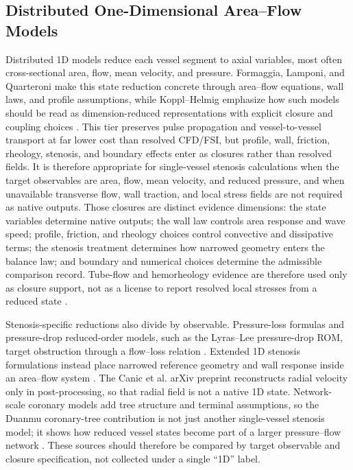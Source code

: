 \subsection{Distributed One-Dimensional Area--Flow Models}
\label{subsec:distributed-one-dimensional-models}

Distributed 1D models reduce each vessel segment to axial variables, most often
cross-sectional area, flow, mean velocity, and pressure. Formaggia, Lamponi,
and Quarteroni make this state reduction concrete through area--flow equations,
wall laws, and profile assumptions, while Koppl--Helmig emphasize how such
models should be read as dimension-reduced representations with explicit
closure and coupling choices
\cite{FormaggiaEtAl2003OneDimensionalBloodFlow,KopplHelmig2023DimensionReducedModeling}.
This tier preserves pulse propagation and vessel-to-vessel transport at far
lower cost than resolved CFD/FSI, but profile, wall, friction, rheology,
stenosis, and boundary effects enter as closures rather than resolved fields.
It is therefore appropriate for single-vessel stenosis calculations when the
target observables are area, flow, mean velocity, and reduced pressure, and
when unavailable transverse flow, wall traction, and local stress fields are
not required as native outputs.
Those closures are distinct evidence dimensions: the state variables determine
native outputs; the wall law controls area response and wave speed; profile,
friction, and rheology choices control convective and dissipative terms; the
stenosis treatment determines how narrowed geometry enters the balance law; and
boundary and numerical choices determine the admissible comparison record.
Tube-flow and hemorheology evidence are therefore used only as closure support,
not as a license to report resolved local stresses from a reduced state
\cite{PriesEtAl1992BloodViscosityTubeFlow,GaldiEtAl2008HemodynamicalFlows,KumarEtAl2019CarreauYasudaHemodynamics,LiuEtAl2021ICASRheology}.

Stenosis-specific reductions also divide by observable. Pressure-loss formulas
and pressure-drop reduced-order models, such as the Lyras--Lee pressure-drop
ROM, target obstruction through a flow--loss relation
\cite{LyrasLee2021PressureDropROM}. Extended 1D stenosis formulations instead
place narrowed reference geometry and wall response inside an area--flow system
\cite{CanicEtAl2024Extended1DStenosis}. The Canic et al. arXiv preprint
reconstructs radial velocity only in post-processing, so that radial field is
not a native 1D state. Network-scale coronary models add tree
structure and terminal assumptions, so the Duanmu coronary-tree contribution is
not just another single-vessel stenosis model; it shows how reduced vessel
states become part of a larger pressure--flow network
\cite{DuanmuEtAl2019CoronaryArterialTree}. These sources should therefore be
compared by target observable and closure specification, not collected under a
single ``1D'' label.

